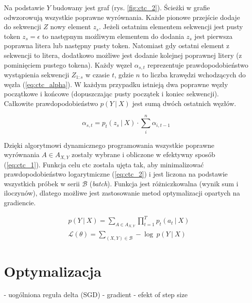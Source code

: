 Na podstawie $Y$ budowany jest graf (rys. \ref{fig:ctc_2}). Ścieżki w grafie odwzorowują wszystkie poprawne wyrównania. Każde pionowe przejście dodaje do sekwencji $Z$ nowy element $z_s$. Jeżeli ostatnim elementem sekwencji jest pusty token $z_{s} = \epsilon$ to następnym możliwym elementem do dodania $z_s$ jest pierwsza poprawna litera lub następny pusty token. Natomiast gdy ostatni element z sekwencji to litera, dodatkowo możliwe jest dodanie kolejnej poprawnej litery (z pominięciem pustego tokena). Każdy węzeł $\alpha_{s,t}$ reprezentuje prawdopodobieństwo wystąpienia sekwencji $Z_{1:s}$ w czasie $t$, gdzie $n$ to liczba krawędzi wchodzących do węzła (\ref{eq:ctc_alpha}). W każdym przypadku istnieją dwa poprawne węzły początkowe i końcowe (dopuszczając pusty początek i koniec sekwencji). Całkowite prawdopodobieństwo $p(Y \ | \ X)$ jest sumą dwóch ostatnich węzłów. 

\begin{equation}
\alpha_{s,t} = p_t(z_s \ | \ X) \cdot \sum_i^n \alpha_{i, t-1}
\label{eq:ctc_alpha}
\end{equation}

Dzięki algorytmowi dynamicznego programowania wszystkie poprawne wyrównania $A \in A_{X,Y}$ zostały wybrane i obliczone w efektywny sposób (\ref{eq:ctc_1}). Funkcja celu \acrshort{ctc} została ujęta tak, aby minimalizować prawdopodobieństwo logarytmiczne (\ref{eq:ctc_2}) i jest liczona na podstawie wszystkich próbek w serii $\mathcal{B}$ (\textit{batch}). Funkcja jest różniczkowalna (wynik sum i iloczynów), dlatego możliwe jest zastosowanie metod optymalizacji opartych na gradiencie. 

\begin{align}
&p(Y \ | \ X) = \sum_{A \in A_{X,Y}} \prod_{t=1}^{T} p_t(a_t \ | \ X) \label{eq:ctc_1} \\
&\mathcal{L}(\theta) = \sum_{(X, Y) \in \mathcal{B}} -\log \ p(Y \ | \ X) \label{eq:ctc_2}
\end{align}


\section{Optymalizacja}





- uogólniona reguła delta (SGD)
- gradient
- efekt of step size





